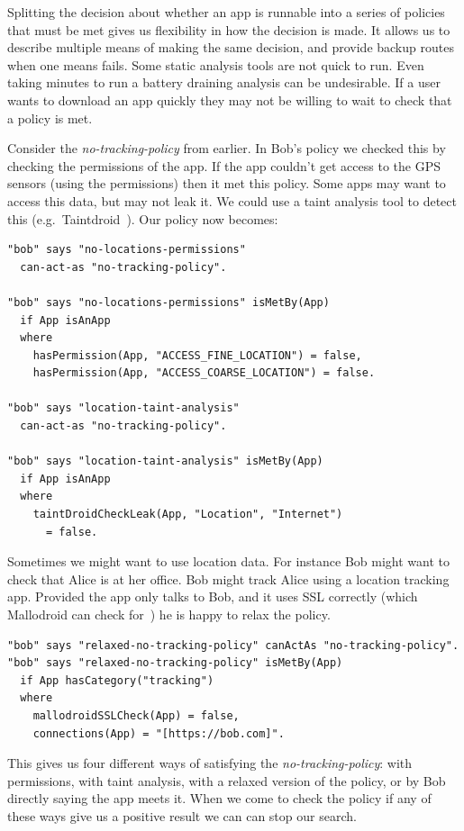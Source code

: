 \documentclass[]{scrartcl}
\begin{document}
Splitting the decision about whether an app is runnable into a series of policies that must be met gives us flexibility in how the decision is made.
It allows us to describe multiple means of making the same decision, and provide backup routes when one means fails.
Some static analysis tools are not quick to run.
Even taking minutes to run a battery draining analysis can be undesirable.
If a user wants to download an app quickly they may not be willing to wait to check that a policy is met.

Consider the \emph{no-tracking-policy} from earlier.
In Bob's policy we checked this by checking the permissions of the app.
If the app couldn't get access to the GPS sensors (using the permissions) then it met this policy.
Some apps may want to access this data, but may not leak it.
We could use a taint analysis tool to detect this (e.g.~Taintdroid~\citep{Fritz:2013vi}).
Our policy now becomes:

\begin{lstlisting}
"bob" says "no-locations-permissions"
  can-act-as "no-tracking-policy".

"bob" says "no-locations-permissions" isMetBy(App)
  if App isAnApp
  where
    hasPermission(App, "ACCESS_FINE_LOCATION") = false,
    hasPermission(App, "ACCESS_COARSE_LOCATION") = false.

"bob" says "location-taint-analysis"
  can-act-as "no-tracking-policy".

"bob" says "location-taint-analysis" isMetBy(App)
  if App isAnApp
  where
    taintDroidCheckLeak(App, "Location", "Internet")
      = false.
\end{lstlisting}

Sometimes we might want to use location data.
For instance Bob might want to check that Alice is at her office.
Bob might track Alice using a location tracking app.
Provided the app only talks to Bob, and it uses SSL correctly (which Mallodroid can check for~\citep{Fahl:2012dj}) he is happy to relax the policy.

\begin{lstlisting}
"bob" says "relaxed-no-tracking-policy" canActAs "no-tracking-policy".
"bob" says "relaxed-no-tracking-policy" isMetBy(App)
  if App hasCategory("tracking")
  where
    mallodroidSSLCheck(App) = false,
    connections(App) = "[https://bob.com]".
\end{lstlisting}

This gives us four different ways of satisfying the \emph{no-tracking-policy}:
  with permissions,
  with taint analysis,
  with a relaxed version of the policy,
  or by Bob directly saying the app meets it.
When we come to check the policy if any of these ways give us a positive result we can can stop our search.
\end{document}
